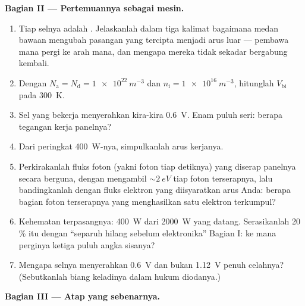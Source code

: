 \begin{problem}
\medskip\noindent\textbf{Bagian II --- Pertemuannya sebagai mesin.}

\begin{enumerate}[resume]
  \item Tiap selnya adalah . Jelaskanlah dalam tiga kalimat
        bagaimana medan bawaan  mengubah pasangan yang
        tercipta menjadi arus luar --- pembawa mana pergi ke arah mana,
        dan mengapa mereka tidak sekadar bergabung kembali.
  \item Dengan $N_{\text{a}} = N_{\text{d}} = \qty{1e22}{m^{-3}}$
        dan $n_{\text{i}} = \qty{1e16}{m^{-3}}$, hitunglah
        $V_{\text{bi}}$ pada \qty{300}{K}.
  \item Sel yang bekerja menyerahkan kira-kira \qty{0.6}{V}. Enam puluh
        seri: berapa tegangan kerja panelnya?
  \item Dari peringkat \qty{400}{W}-nya, simpulkanlah arus
        kerjanya.
  \item Perkirakanlah fluks foton (yakni foton tiap detiknya) yang diserap
        panelnya secara berguna, dengan mengambil $\sim\qty{2}{eV}$ tiap foton
        terserapnya, lalu bandingkanlah dengan fluks elektron yang diisyaratkan arus
        Anda: berapa bagian foton terserapnya yang menghasilkan
        satu elektron terkumpul?
  \item Kehematan terpasangnya: \qty{400}{W} dari
        \qty{2000}{W} yang datang. Serasikanlah 20\,\% itu dengan
        ``separuh hilang sebelum elektronika'' Bagian I: ke mana perginya
        ketiga puluh angka sisanya?
  \item Mengapa selnya menyerahkan \qty{0.6}{V} dan bukan
        \qty{1.12}{V} penuh celahnya? (Sebutkanlah biang keladinya dalam
        hukum diodanya.)
\end{enumerate}

\medskip\noindent\textbf{Bagian III --- Atap yang sebenarnya.}


\end{problem}
